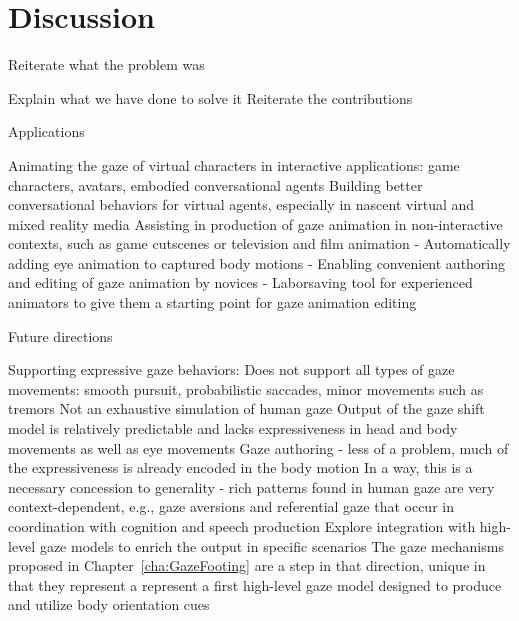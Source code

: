 \pagestyle{deposit}

\chapter{Discussion}
\label{cha:Discussion}

Reiterate what the problem was

Explain what we have done to solve it
Reiterate the contributions

Applications

Animating the gaze of virtual characters in interactive applications: game characters, avatars, embodied conversational agents
Building better conversational behaviors for virtual agents, especially in nascent virtual and mixed reality media
Assisting in production of gaze animation in non-interactive contexts, such as game cutscenes or television and film animation
- Automatically adding eye animation to captured body motions
- Enabling convenient authoring and editing of gaze animation by novices
- Laborsaving tool for experienced animators to give them a starting point for gaze animation editing

Future directions

Supporting expressive gaze behaviors:
Does not support all types of gaze movements: smooth pursuit, probabilistic saccades, minor movements such as tremors
Not an exhaustive simulation of human gaze
Output of the gaze shift model is relatively predictable and lacks expressiveness in head and body movements as well as eye movements
Gaze authoring - less of a problem, much of the expressiveness is already encoded in the body motion
In a way, this is a necessary concession to generality - rich patterns found in human gaze are very context-dependent, e.g., gaze aversions and referential gaze that occur in coordination with cognition and speech production
Explore integration with high-level gaze models to enrich the output in specific scenarios
The gaze mechanisms proposed in Chapter~\ref{cha:GazeFooting} are a step in that direction, unique in that they represent a represent a first high-level gaze model designed to produce and utilize body orientation cues

